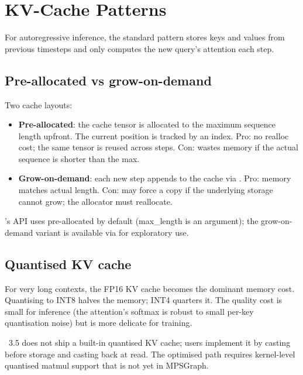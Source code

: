 \section{KV-Cache Patterns}
\label{sec:attention:kv_cache_patterns}

For autoregressive inference, the standard pattern stores keys
and values from previous timesteps and only computes the new
query's attention each step.

\subsection{Pre-allocated vs grow-on-demand}
\label{ssec:attention:kv_alloc}

Two cache layouts:

\begin{itemize}
  \item \textbf{Pre-allocated}: the cache tensor is allocated
    to the maximum sequence length upfront. The current
    position is tracked by an index. Pro: no realloc cost; the
    same tensor is reused across steps. Con: wastes memory if
    the actual sequence is shorter than the max.
  \item \textbf{Grow-on-demand}: each new step appends to the
    cache via . Pro: memory matches actual length.
    Con:  may force a copy if the underlying storage
    cannot grow; the allocator must reallocate.
\end{itemize}

\Lucid's  API uses pre-allocated by
default (max\_length is an argument); the grow-on-demand
variant is available via  for
exploratory use.

\subsection{Quantised KV cache}
\label{ssec:attention:kv_quant}

For very long contexts, the FP16 KV cache becomes the dominant
memory cost. Quantising to INT8 halves the memory; INT4 quarters
it. The quality cost is small for inference (the
attention's softmax is robust to small per-key quantisation
noise) but is more delicate for training.

\Lucid\ 3.5 does not ship a built-in quantised KV cache; users
implement it by casting before storage and casting back at
read. The optimised path requires kernel-level quantised
matmul support that is not yet in MPSGraph.

